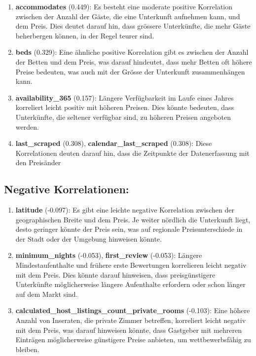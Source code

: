 \documentclass[
  journal,
]{IEEEtran}%
\begin{document}
\begin{enumerate}
\def\labelenumi{\arabic{enumi}.}
\item
  \textbf{accommodates} (0.449): Es besteht eine moderate positive
  Korrelation zwischen der Anzahl der Gäste, die eine Unterkunft
  aufnehmen kann, und dem Preis. Dies deutet darauf hin, dass grössere
  Unterkünfte, die mehr Gäste beherbergen können, in der Regel teurer
  sind.
\item
  \textbf{beds} (0.329): Eine ähnliche positive Korrelation gibt es
  zwischen der Anzahl der Betten und dem Preis, was darauf hindeutet,
  dass mehr Betten oft höhere Preise bedeuten, was auch mit der Grösse
  der Unterkunft zusammenhängen kann.
\item
  \textbf{availability\_365} (0.157): Längere Verfügbarkeit im Laufe
  eines Jahres korreliert leicht positiv mit höheren Preisen. Dies
  könnte bedeuten, dass Unterkünfte, die seltener verfügbar sind, zu
  höheren Preisen angeboten werden.
\item
  \textbf{last\_scraped} (0.308), \textbf{calendar\_last\_scraped}
  (0.308): Diese Korrelationen deuten darauf hin, dass die Zeitpunkte
  der Datenerfassung mit den Preisänder
\end{enumerate}

\hypertarget{negative-korrelationen}{%
\subsection{\texorpdfstring{\textbf{Negative
Korrelationen:}}{Negative Korrelationen:}}\label{negative-korrelationen}}

\begin{enumerate}
\def\labelenumi{\arabic{enumi}.}
\item
  \textbf{latitude} (-0.097): Es gibt eine leichte negative Korrelation
  zwischen der geographischen Breite und dem Preis. Je weiter nördlich
  die Unterkunft liegt, desto geringer könnte der Preis sein, was auf
  regionale Preisunterschiede in der Stadt oder der Umgebung hinweisen
  könnte.
\item
  \textbf{minimum\_nights} (-0.053), \textbf{first\_review} (-0.053):
  Längere Mindestaufenthalte und frühere erste Bewertungen korrelieren
  leicht negativ mit dem Preis. Dies könnte darauf hinweisen, dass
  preisgünstigere Unterkünfte möglicherweise längere Aufenthalte
  erfordern oder schon länger auf dem Markt sind.
\item
  \textbf{calculated\_host\_listings\_count\_private\_rooms} (-0.103):
  Eine höhere Anzahl von Inseraten, die private Zimmer betreffen,
  korreliert leicht negativ mit dem Preis, was darauf hinweisen könnte,
  dass Gastgeber mit mehreren Einträgen möglicherweise günstigere Preise
  anbieten, um wettbewerbsfähig zu bleiben.
\end{enumerate}
\end{document}
